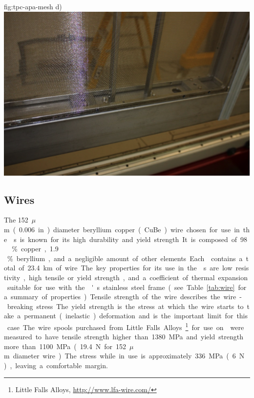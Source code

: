 \begin{dunefigure}{fig:tpc-apa-mesh}
{d) \includegraphics[height=0.23\textheight]{graphics/sp-apa-mesh-installed.png}}
\end{dunefigure}




\subsection{Wires}
\label{sec:fdsp-apa-wires}

The \SI{152}{$\mu$m} (\SI{.006}{in}) diameter beryllium copper (CuBe) wire chosen for use in the s is known for its high durability and yield strength. It is composed of \num{98}\,\% copper, \num{1.9}\,\% beryllium, and a negligible amount of other elements. Each  contains a total of \SI{23.4}{km} of wire.  

The key properties for its use in the s are low resistivity, high tensile or yield strength, and a coefficient of thermal expansion suitable for use with the 's stainless steel frame (see Table~\ref{tab:wire} for a summary of properties).  Tensile strength of the wire describes the wire-breaking stress.  The yield strength is the stress at which the wire starts to take a permanent (inelastic) deformation and is the important limit for this case. The wire spools purchased from Little Falls Alloys\footnote{Little Falls Alloys\texttrademark, \url{http://www.lfa-wire.com/}} for use on  were measured to have tensile strength higher than \SI{1380}{MPa} and yield strength more than \SI{1100}{MPa} (\SI{19.4}{N} for \SI{152}{$\mu$m} diameter wire).  The stress while in use is approximately \SI{336}{MPa} (\SI{6}{N}), leaving a comfortable margin.

